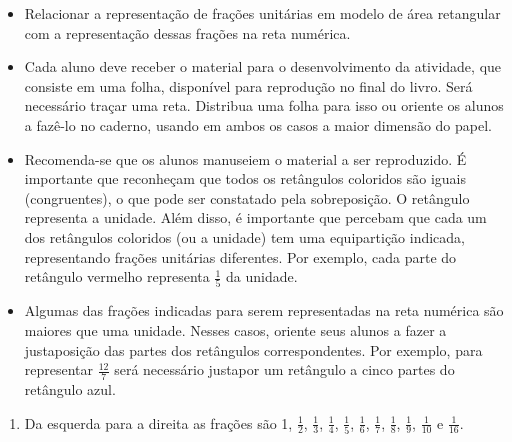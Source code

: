 \begin{atividade}\label{chap3-ativ17}
\objetivos
\begin{itemize} %
    \item       Relacionar a representação de frações unitárias em modelo de área retangular com a representação dessas frações na reta numérica.
\end{itemize} %

\discussoes
\begin{itemize} %
    \item  Cada aluno deve receber o material para o desenvolvimento da atividade, que consiste em uma folha, disponível para reprodução no final do livro. Será necessário traçar uma reta. Distribua uma folha para isso ou oriente os alunos a fazê-lo no caderno, usando em ambos os casos a maior dimensão do papel.
    \item Recomenda-se que os alunos manuseiem o material a ser reproduzido. É importante que reconheçam que todos os retângulos coloridos são iguais (congruentes), o que pode ser constatado pela sobreposição. O retângulo representa a unidade. Além disso, é importante que percebam que cada um dos retângulos coloridos (ou a unidade) tem uma equipartição indicada, representando frações unitárias diferentes. Por exemplo, cada parte do retângulo vermelho representa       $\frac{1}{5}$       da unidade.
    \item       Algumas das frações indicadas para serem representadas na reta numérica são maiores que uma unidade. Nesses casos, oriente seus alunos a fazer a justaposição das partes dos retângulos correspondentes. Por exemplo, para representar       $\frac{12}{7}$       será necessário justapor um retângulo a cinco partes do retângulo azul.
\end{itemize} %

\solucao
\begin{enumerate}
\item Da esquerda para a direita as frações são 1, $\frac{1}{2}$, $\frac{1}{3}$, $\frac{1}{4}$, $\frac{1}{5}$, $\frac{1}{6}$, $\frac{1}{7}$, $\frac{1}{8}$, $\frac{1}{9}$, $\frac{1}{10}$ e $\frac{1}{16}$.



\end{enumerate}
\end{atividade}
